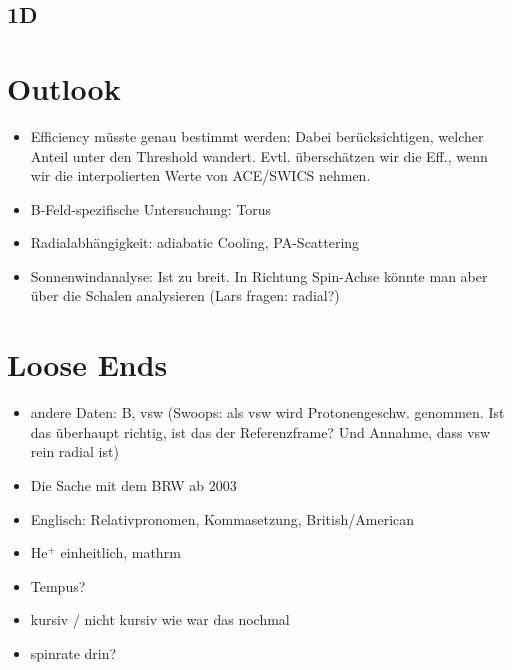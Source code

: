 \subsection{1D}

\section{Outlook}
\begin{itemize}
	\item Efficiency müsste genau bestimmt werden: Dabei berücksichtigen, welcher Anteil unter den Threshold wandert. Evtl. überschätzen wir die Eff., wenn wir die interpolierten Werte von ACE/SWICS nehmen.
	\item B-Feld-spezifische Untersuchung: Torus
	\item Radialabhängigkeit: adiabatic Cooling, PA-Scattering
	\item Sonnenwindanalyse: Ist zu breit. In Richtung Spin-Achse könnte man aber über die Schalen analysieren (Lars fragen: radial?)
	
\end{itemize}





\section{Loose Ends}
\begin{itemize}
	\item andere Daten: B, vsw (Swoops: als vsw wird Protonengeschw. genommen. Ist das überhaupt richtig, ist das der Referenzframe? Und Annahme, dass vsw rein radial ist)
	\item Die Sache mit dem BRW ab 2003
	\item Englisch: Relativpronomen, Kommasetzung, British/American
	\item $\mathrm{He^{+}}$ einheitlich, mathrm
	\item Tempus?
	\item kursiv / nicht kursiv wie war das nochmal
	\item spinrate drin?
\end{itemize}
